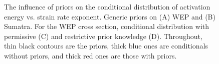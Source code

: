 \documentclass[12pt]{article}
\begin{document}
{%





\begin{figure}[H]
\centering
\hspace{-0.85cm}
 
\caption{The influence of priors on the conditional distribution of activation energy vs. strain rate exponent. Generic priors on (A) WEP 
 and (B) Sumatra. 
For the WEP cross section, conditional distribution with permissive (C) and 
restrictive prior knowledge (D).  
Throughout, thin black contours are the priors, thick blue ones
are conditionals without priors, and thick red ones are those with priors.}
\label{fig:activ_distrib}
\end{figure}



}
\end{document}
